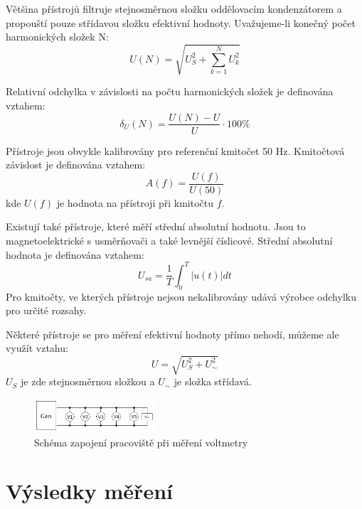 \documentclass[a4paper, czech]{article}
\begin{document}
Většina přístrojů filtruje stejnosměrnou složku oddělovacím kondenzátorem a propouští pouze střídavou složku efektivní hodnoty.
Uvažujeme-li konečný počet harmonických složek N:
\begin{equation*}
    U \left(N\right) = \sqrt{U_S^2 + \sum_{k=1}^{N} U_k^2}
\end{equation*}

Relativní odchylka v závislosti na počtu harmonických složek je definována vztahem:
\begin{equation*}
    \delta_U \left(N\right) = \frac{U \left(N\right) - U}{U} \cdot 100\%
\end{equation*}

Přístroje jsou obvykle kalibrovány pro referenční kmitočet 50 Hz. Kmitočtová závislost je definována vztahem:
\begin{equation*}
    A \left(f\right) = \frac{U\left(f\right)}{U\left(50\right)}
\end{equation*}
kde $U\left(f\right)$ je hodnota na přístroji při kmitočtu $f$.

Existují také přístroje, které měří střední absolutní hodnotu.
Jsou to magnetoelektrické s usměrňovači a také levnější číslicové.
Střední absolutní hodnota je definována vztahem:
\begin{equation*}
    U_{sa} = \frac{1}{T} \int_{0}^{T} \left|u\left(t\right)\right| dt
\end{equation*}
Pro kmitočty, ve kterých přístroje nejsou nekalibrovány udává výrobce odchylku pro určité rozsahy. 

Některé přístroje se pro měření efektivní hodnoty přímo nehodí, můžeme ale využít vztahu:
\begin{equation*}
    U = \sqrt{U_S^2 + U_{\sim}^2}
\end{equation*}
$U_S$ je zde stejnosměrnou složkou a $U_{\sim}$ je složka střídavá.

\begin{figure}[H]
    \centering
    \includegraphics[width=0.4\textwidth]{schema1.png}
    \caption{Schéma zapojení pracoviště při měření voltmetry}
\end{figure}

\section{Výsledky měření}
\end{document}
